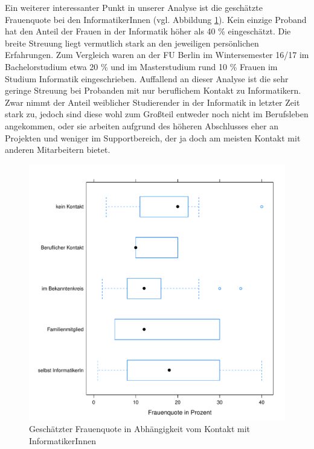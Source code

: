 \documentclass[de]{agse-empir-report}\usepackage[]{graphicx}\usepackage[]{color}
\newenvironment{knitrout}{}{} %
\begin{document}
Ein weiterer interessanter Punkt in unserer Analyse ist die gesch\"atzte Frauenquote bei den InformatikerInnen (vgl. Abbildung \ref{fig:frauenquote}). Kein einzige Proband hat den Anteil der Frauen in der Informatik h\"oher als 40 \% eingesch\"atzt. Die breite Streuung liegt vermutlich stark an den jeweiligen pers\"onlichen Erfahrungen. Zum Vergleich waren an der FU Berlin im Wintersemester 16/17 im Bachelorstudium etwa 20 \% und im Masterstudium rund 10 \% Frauen im Studium Informatik eingeschrieben.  Auffallend an dieser Analyse ist die sehr geringe Streuung bei Probanden mit nur beruflichem Kontakt zu Informatikern. Zwar nimmt der Anteil weiblicher Studierender in der Informatik in letzter Zeit stark zu, jedoch sind diese wohl zum Gro{\ss}teil entweder noch nicht im Berufsleben angekommen, oder sie arbeiten aufgrund des h\"oheren Abschlusses eher an Projekten und weniger im Supportbereich, der ja doch am meisten Kontakt mit anderen Mitarbeitern bietet.

\begin{figure}
\begin{knitrout}
\color{fgcolor}
\includegraphics[width=\linewidth]{figure/chart_quote-1} 

\end{knitrout}
    \caption{Gesch\"atzter Frauenquote in Abh\"angigkeit vom Kontakt mit InformatikerInnen}
    \label{fig:frauenquote}
\end{figure}
\end{document}
